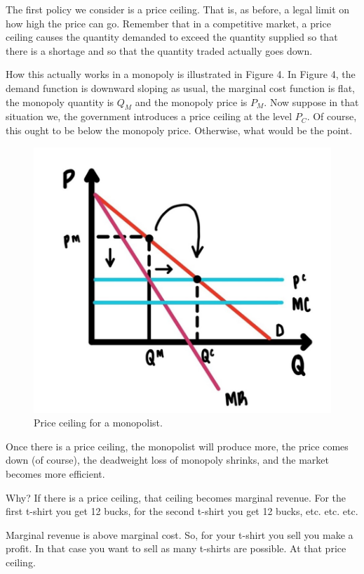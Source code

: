 \documentclass[
]{book}
\begin{document}
The first policy we consider is a price ceiling. That is, as before, a legal limit on how high the price can go. Remember that in a competitive market, a price ceiling causes the quantity demanded to exceed the quantity supplied so that there is a shortage and so that the quantity traded actually goes down.

How this actually works in a monopoly is illustrated in Figure 4. In Figure 4, the demand function is downward sloping as usual, the marginal cost function is flat, the monopoly quantity is \(Q_M\) and the monopoly price is \(P_M\). Now suppose in that situation we, the government introduces a price ceiling at the level \(P_C\). Of course, this ought to be below the monopoly price. Otherwise, what would be the point.

\begin{figure}

{\centering \includegraphics[width=0.75\linewidth]{img/ch6/fig5} 

}

\caption{Price ceiling for a monopolist.}\label{fig:fig605}
\end{figure}

Once there is a price ceiling, the monopolist will produce more, the price comes down (of course), the deadweight loss of monopoly shrinks, and the market becomes more efficient.

Why? If there is a price ceiling, that ceiling becomes marginal revenue. For the first t-shirt you get 12 bucks, for the second t-shirt you get 12 bucks, etc. etc. etc.

Marginal revenue is above marginal cost. So, for your t-shirt you sell you make a profit. In that case you want to sell as many t-shirts are possible. At that price ceiling.
\end{document}
